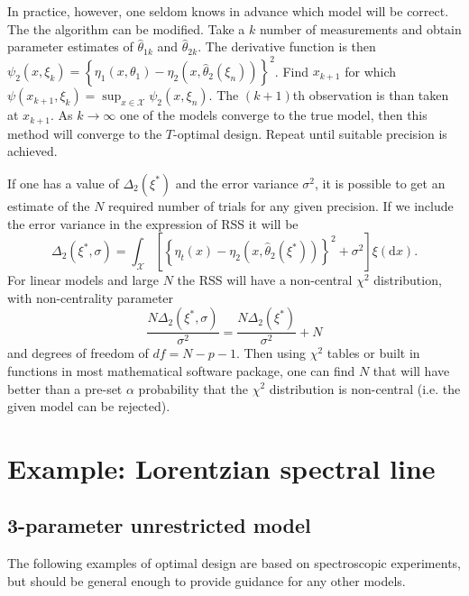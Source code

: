 \documentclass[12pt]{iopart}
\begin{document}
In practice, however, one seldom knows in advance which model will be correct. The the algorithm can be modified. Take a $k$ number of measurements and obtain parameter estimates of $\hat \theta_{1k}$ and $\hat \theta_{2k}$. The derivative function is then $\psi_2(x, \xi_k) = \left\{\eta_1(x, \theta_1) - \eta_2(x, \hat \theta_2(\xi_n))\right\}^2$. Find $x_{k+1}$ for which $\psi(x_{k+1}, \xi_k) = \sup_{x \in \mathcal{X}}\psi_2(x, \xi_n)$. The $(k+1)$th observation is than taken at $x_{k+1}$. As $k \rightarrow \infty$ one of the models converge to the true model, then this method will converge to the $T$-optimal design. Repeat until suitable precision is achieved.

If one has a value of $\Delta_2(\xi^*)$ and the error variance $\sigma^2$, it is possible to get an estimate of the $N$ required number of trials for any given precision. If we include the error variance in the  expression of RSS it will be
\begin{equation}
\Delta_2(\xi^*, \sigma) = \int_{\mathcal{X}} \left[\left\{\eta_t(x) - \eta_2(x, \hat \theta_2(\xi^*))\right\}^2 + \sigma^2\right]\xi(\mathrm{d}x).
\label{eq:rssvar}
\end{equation}
For linear models and large $N$ the RSS will have a non-central $\chi^2$ distribution, with non-centrality parameter
\begin{equation}
\frac{N\Delta_2(\xi^*, \sigma)}{\sigma^2 } = \frac{N \Delta_2(\xi^*)}{\sigma^2} + N
\end{equation}
and degrees of freedom of $df = N - p - 1$. Then using $\chi^2$ tables or built in functions in most mathematical software package, one can find $N$ that will have better than a pre-set $\alpha$ probability that the $\chi^2$ distribution is non-central (i.e. the given model can be rejected).



\section{Example: Lorentzian spectral line}

\subsection{3-parameter unrestricted model}
\label{seq:exopt}

The following examples of optimal design are based on spectroscopic experiments, but should be general enough to provide guidance for any other models.
\end{document}
